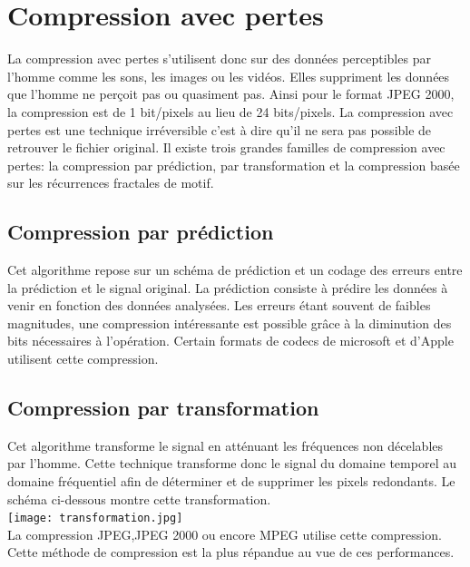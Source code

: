 \documentclass[a4paper]{report}
\begin{document}
	\section{Compression avec pertes}
		La compression avec pertes s'utilisent donc sur des données perceptibles par l'homme comme les sons, les images ou les vidéos. Elles suppriment les données que l'homme ne perçoit pas ou quasiment pas. Ainsi pour le format JPEG 2000, la compression est de 1 bit/pixels au lieu de 24 bits/pixels. La compression avec pertes est une technique irréversible c'est à dire qu'il ne sera pas possible de retrouver le fichier original. Il existe trois grandes familles de compression avec pertes: la compression par prédiction, par transformation et la compression basée sur les récurrences fractales de motif.
	\subsection{Compression par prédiction}
		Cet algorithme repose sur un schéma de prédiction et un codage des erreurs entre la prédiction et le signal original. La prédiction consiste à prédire les données à venir en fonction des données analysées. Les erreurs étant souvent de faibles magnitudes, une compression intéressante est possible grâce à la diminution des bits nécessaires à l’opération. Certain formats de codecs de microsoft et d'Apple utilisent cette compression.
	\subsection{Compression par transformation}
		Cet algorithme transforme le signal en atténuant les fréquences non décelables par l'homme. Cette technique transforme donc le signal du domaine temporel au domaine fréquentiel afin de déterminer et de supprimer les pixels redondants.  Le schéma ci-dessous montre cette transformation.\\
	\texttt{[image: transformation.jpg]} \\
La compression JPEG,JPEG 2000 ou encore MPEG utilise cette compression. Cette méthode de compression est la plus répandue au vue de ces performances.
\end{document}
